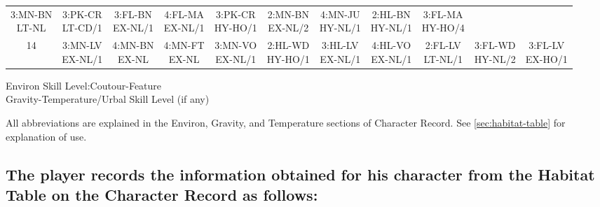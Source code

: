 \begin{table}[htbp]
{\begin{minipage}{0.9\textwidth}
\begin{tabular}{c|cccccccccc}
    \parbox{\cellwidth}{3:MN-BN\\LT-NL} & 
    \parbox{\cellwidth}{3:PK-CR\\LT-CD/1} & 
    \parbox{\cellwidth}{3:FL-BN\\EX-NL/1} & 
    \parbox{\cellwidth}{4:FL-MA\\EX-NL/1} & 
    \parbox{\cellwidth}{3:PK-CR\\HY-HO/1} & 
    \parbox{\cellwidth}{2:MN-BN\\EX-NL/2} & 
    \parbox{\cellwidth}{4:MN-JU\\HY-NL/1} & 
    \parbox{\cellwidth}{2:HL-BN\\HY-NL/1} & 
    \parbox{\cellwidth}{3:FL-MA\\HY-HO/4}\\[\extralinespace]
    14 & 
    \parbox{\cellwidth}{3:MN-LV\\EX-NL/1} & 
    \parbox{\cellwidth}{4:MN-BN\\EX-NL} & 
    \parbox{\cellwidth}{4:MN-FT\\EX-NL} & 
    \parbox{\cellwidth}{3:MN-VO\\EX-NL/1} & 
    \parbox{\cellwidth}{2:HL-WD\\HY-HO/1} & 
    \parbox{\cellwidth}{3:HL-LV\\EX-NL/1} & 
    \parbox{\cellwidth}{4:HL-VO\\EX-NL/1} & 
    \parbox{\cellwidth}{2:FL-LV\\LT-NL/1} & 
    \parbox{\cellwidth}{3:FL-WD\\HY-NL/2} & 
    \parbox{\cellwidth}{3:FL-LV\\EX-HO/1}\\[\extralinespace]
  \end{tabular}

  \medskip

  \parbox{0.9\textwidth}{Environ Skill Level:Coutour-Feature\\
    Gravity-Temperature/Urbal Skill Level (if any)

    All abbreviations are explained in the Environ, Gravity, and
    Temperature sections of Character Record. See
    \ref{sec:habitat-table} for explanation of use.}
\end{minipage}}
\end{table}
              

\subsection[Recording Habitat Table Info]{The player records the
    information obtained for his 
    character from the Habitat Table on the Character Record as
    follows:}
\label{sec:habitat-table-use}

